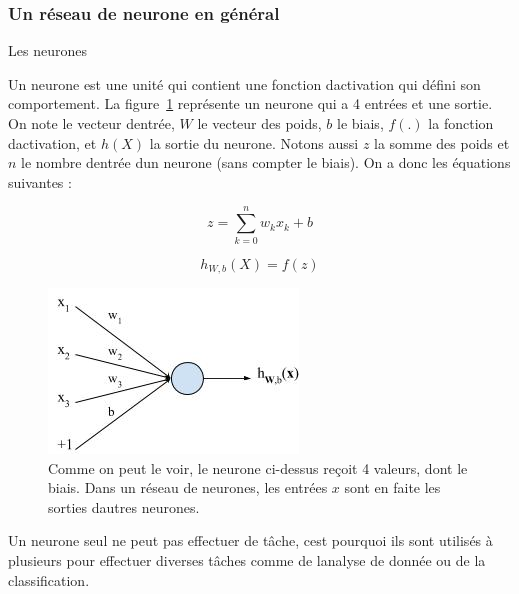 \documentclass[11pt]{sdm}
\begin{document}
		\subsubsection{Un r\'eseau de neurone en g\'en\'eral}
		\label{seq:simpleNeuralNetwork}
			\begin{itshape}Les neurones\end{itshape}
			\smallbreak
			Un neurone est une unit\'e qui contient une fonction d\textquotesingle activation qui d\'efini son comportement. La figure~\ref{fig:neural} repr\'esente un neurone qui a 4 entr\'ees et une sortie. On note  le vecteur d\textquotesingle entr\'ee, \textbf{$W$} le vecteur des poids, $b$ le biais, $f(.)$ la fonction d\textquotesingle activation, et $h(X)$ la sortie du neurone. Notons aussi $z$ la somme des poids et $n$ le nombre d\textquotesingle entr\'ee d\textquotesingle un neurone (sans compter le biais). On a donc les \'equations suivantes :
			
			\begin{equation}
				z = \sum_{k=0}^n w_k x_k + b
				\label{eq:z}
			\end{equation}

			\begin{equation}
				h_{W,b}(X) = f(z)
				\label{eq:h}
			\end{equation}

			\begin{figure}[!ht]
				\centering
				\includegraphics[scale=0.7,natwidth=251,natheight=166]{figures/neural.png}
				\caption{Comme on peut le voir, le neurone ci-dessus re\c coit 4 valeurs, dont le biais. Dans un r\'eseau de neurones, les entr\'ees $x$ sont en faite les sorties d\textquotesingle autres neurones.}
				\label{fig:neural}
			\end{figure}

			Un neurone seul ne peut pas effectuer de t\^ache, c\textquotesingle est pourquoi ils sont utilis\'es \`a plusieurs pour effectuer diverses t\^aches comme de l\textquotesingle analyse de donn\'ee ou de la classification.	
\end{document}
